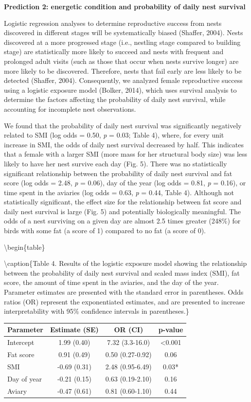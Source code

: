 \documentclass[
]{article}
\begin{document}
\textbf{Prediction 2: energetic condition and probability of daily nest
survival}

Logistic regression analyses to determine reproductive success from
nests discovered in different stages will be systematically biased
(Shaffer, 2004). Nests discovered at a more progressed stage (i.e.,
nestling stage compared to building stage) are statistically more likely
to succeed and nests with frequent and prolonged adult visits (such as
those that occur when nests survive longer) are more likely to be
discovered. Therefore, nests that fail early are less likely to be
detected (Shaffer, 2004). Consequently, we analyzed female reproductive
success using a logistic exposure model (Bolker, 2014), which uses
survival analysis to determine the factors affecting the probability of
daily nest survival, while accounting for incomplete nest observations.

We found that the probability of daily nest survival was significantly
negatively related to SMI (log odds = 0.50, \emph{p} = 0.03; Table 4),
where, for every unit increase in SMI, the odds of daily nest survival
decreased by half. This indicates that a female with a larger SMI (more
mass for her structural body size) was less likely to have her nest
survive each day (Fig. 5). There was no statistically significant
relationship between the probability of daily nest survival and fat
score (log odds = 2.48, \emph{p} = 0.06), day of the year (log odds =
0.81, \emph{p} = 0.16), or time spent in the aviaries (log odds = 0.63,
\emph{p} = 0.44, Table 4). Although not statistically significant, the
effect size for the relationship between fat score and daily nest
survival is large (Fig. 5) and potentially biologically meaningful. The
odds of a nest surviving on a given day are almost 2.5 times greater
(248\%) for birds with some fat (a score of 1) compared to no fat (a
score of 0).

\textbackslash begin\{table\}

\textbackslash caption\{\label{tab:logexp}Table 4. Results of the
logistic exposure model showing the relationship between the probability
of daily nest survival and scaled mass index (SMI), fat score, the
amount of time spent in the aviaries, and the day of the year. Parameter
estimates are presented with the standard error in parentheses. Odds
ratios (OR) represent the exponentiated estimates, and are presented to
increase interpretability with 95\% confidence intervals in
parentheses.\} \centering

\begin{tabular}[t]{l|c|c|c}
\hline
Parameter & Estimate (SE) & OR (CI) & p-value\\
\hline
Intercept & 1.99 (0.40) & 7.32 (3.3-16.0) & <0.001\\
\hline
Fat score & 0.91 (0.49) & 0.50 (0.27-0.92) & 0.06\\
\hline
SMI & -0.69 (0.31) & 2.48 (0.95-6.49) & 0.03*\\
\hline
Day of year & -0.21 (0.15) & 0.63 (0.19-2.10) & 0.16\\
\hline
Aviary & -0.47 (0.61) & 0.81 (0.60-1.10) & 0.44\\
\hline
\end{tabular}
\end{document}
